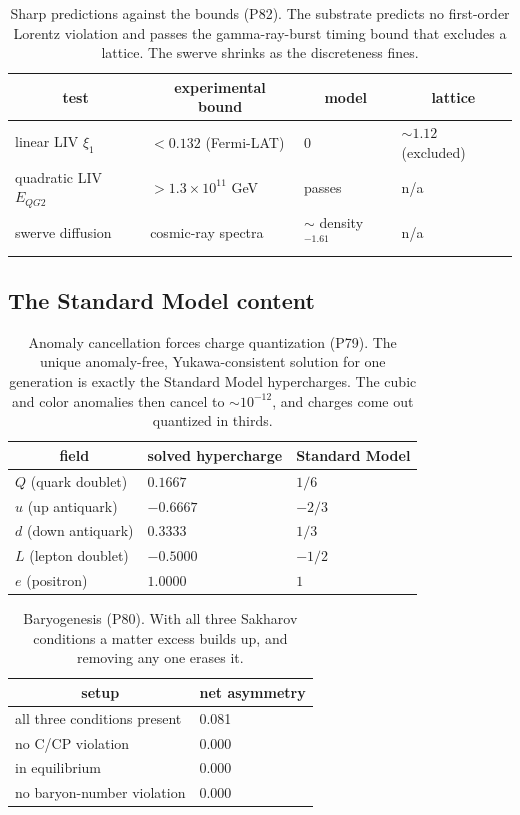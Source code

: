 \begin{table}[H]
\centering
\small
\begin{tabular}{llll}
\toprule
\multicolumn{1}{c}{test} & \multicolumn{1}{c}{experimental bound} & \multicolumn{1}{c}{model} & \multicolumn{1}{c}{lattice} \\
\midrule
linear LIV $\xi_1$ & $<0.132$ (Fermi-LAT) & $0$ & $\sim 1.12$ (excluded) \\
quadratic LIV $E_{QG2}$ & $>1.3\times 10^{11}$ GeV & passes & n/a \\
swerve diffusion & cosmic-ray spectra & $\sim$ density$^{-1.61}$ & n/a \\
\bottomrule
\end{tabular}
\caption{Sharp predictions against the bounds (P82). The substrate predicts no first-order Lorentz violation and passes the gamma-ray-burst timing bound that excludes a lattice. The swerve shrinks as the discreteness fines.}
\end{table}

\subsection{The Standard Model content}

\begin{table}[H]
\centering
\small
\begin{tabular}{lll}
\toprule
\multicolumn{1}{c}{field} & \multicolumn{1}{c}{solved hypercharge} & \multicolumn{1}{c}{Standard Model} \\
\midrule
$Q$ (quark doublet) & $0.1667$ & $1/6$ \\
$u$ (up antiquark) & $-0.6667$ & $-2/3$ \\
$d$ (down antiquark) & $0.3333$ & $1/3$ \\
$L$ (lepton doublet) & $-0.5000$ & $-1/2$ \\
$e$ (positron) & $1.0000$ & $1$ \\
\bottomrule
\end{tabular}
\caption{Anomaly cancellation forces charge quantization (P79). The unique anomaly-free, Yukawa-consistent solution for one generation is exactly the Standard Model hypercharges. The cubic and color anomalies then cancel to $\sim 10^{-12}$, and charges come out quantized in thirds.}
\end{table}

\begin{table}[H]
\centering
\small
\begin{tabular}{ll}
\toprule
\multicolumn{1}{c}{setup} & \multicolumn{1}{c}{net asymmetry} \\
\midrule
all three conditions present & 0.081 \\
no C/CP violation & 0.000 \\
in equilibrium & 0.000 \\
no baryon-number violation & 0.000 \\
\bottomrule
\end{tabular}
\caption{Baryogenesis (P80). With all three Sakharov conditions a matter excess builds up, and removing any one erases it.}
\end{table}

